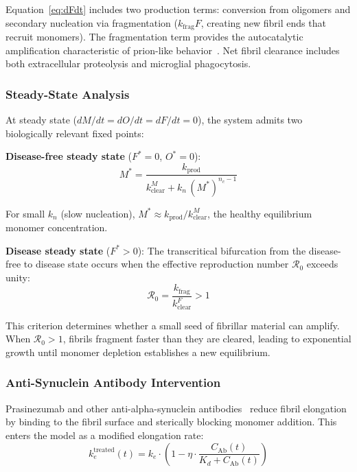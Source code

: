 Equation~\eqref{eq:dFdt} includes two production terms: conversion from oligomers and secondary nucleation via fragmentation ($k_\text{frag} F$, creating new fibril ends that recruit monomers). The fragmentation term provides the autocatalytic amplification characteristic of prion-like behavior~\cite{knowles2009}. Net fibril clearance includes both extracellular proteolysis and microglial phagocytosis.

\subsubsection{Steady-State Analysis}

At steady state ($dM/dt = dO/dt = dF/dt = 0$), the system admits two biologically relevant fixed points:

\textbf{Disease-free steady state} ($F^* = 0$, $O^* = 0$):
\begin{equation}
M^* = \frac{k_\text{prod}}{k_\text{clear}^M + k_n \, (M^*)^{n_c - 1}}
\label{eq:ss-healthy}
\end{equation}

For small $k_n$ (slow nucleation), $M^* \approx k_\text{prod} / k_\text{clear}^M$, the healthy equilibrium monomer concentration.

\textbf{Disease steady state} ($F^* > 0$): The transcritical bifurcation from the disease-free to disease state occurs when the effective reproduction number $\mathcal{R}_0$ exceeds unity:
\begin{equation}
\mathcal{R}_0 = \frac{k_\text{frag}}{k_\text{clear}^F} > 1
\label{eq:R0-agg}
\end{equation}

This criterion determines whether a small seed of fibrillar material can amplify. When $\mathcal{R}_0 > 1$, fibrils fragment faster than they are cleared, leading to exponential growth until monomer depletion establishes a new equilibrium.

\subsubsection{Anti-Synuclein Antibody Intervention}

Prasinezumab and other anti-alpha-synuclein antibodies~\cite{pagano2022,pagano2024} reduce fibril elongation by binding to the fibril surface and sterically blocking monomer addition. This enters the model as a modified elongation rate:
\begin{equation}
k_e^\text{treated}(t) = k_e \cdot \left(1 - \eta \cdot \frac{C_\text{Ab}(t)}{K_d + C_\text{Ab}(t)}\right)
\label{eq:prasinezumab}
\end{equation}

